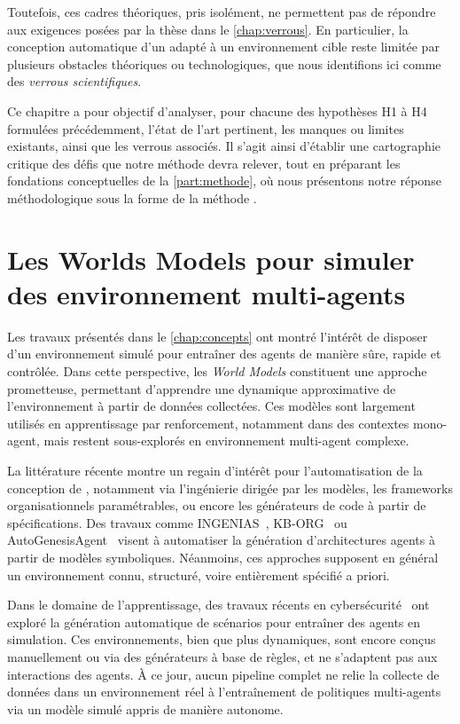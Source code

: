 Toutefois, ces cadres théoriques, pris isolément, ne permettent pas de répondre aux exigences posées par la thèse dans le \autoref{chap:verrous}. En particulier, la conception automatique d'un  adapté à un environnement cible reste limitée par plusieurs obstacles théoriques ou technologiques, que nous identifions ici comme des \textit{verrous scientifiques}.

Ce chapitre a pour objectif d'analyser, pour chacune des hypothèses H1 à H4 formulées précédemment, l'état de l'art pertinent, les manques ou limites existants, ainsi que les verrous associés. Il s'agit ainsi d'établir une cartographie critique des défis que notre méthode devra relever, tout en préparant les fondations conceptuelles de la \autoref{part:methode}, où nous présentons notre réponse méthodologique sous la forme de la méthode .


\section{Les Worlds Models pour simuler des environnement multi-agents}

\noindent
Les travaux présentés dans le \autoref{chap:concepts} ont montré l'intérêt de disposer d'un environnement simulé pour entraîner des agents de manière sûre, rapide et contrôlée. Dans cette perspective, les \textit{World Models} constituent une approche prometteuse, permettant d'apprendre une dynamique approximative de l'environnement à partir de données collectées. Ces modèles sont largement utilisés en apprentissage par renforcement, notamment dans des contextes mono-agent, mais restent sous-explorés en environnement multi-agent complexe.

\medskip

\noindent
La littérature récente montre un regain d'intérêt pour l'automatisation de la conception de , notamment via l'ingénierie dirigée par les modèles, les frameworks organisationnels paramétrables, ou encore les générateurs de code à partir de spécifications. Des travaux comme INGENIAS~\cite{Pavon2003}, KB-ORG~\cite{Sims2008} ou AutoGenesisAgent~\cite{harper2024autogenesisagent} visent à automatiser la génération d'architectures agents à partir de modèles symboliques. Néanmoins, ces approches supposent en général un environnement connu, structuré, voire entièrement spécifié a priori.

\noindent
Dans le domaine de l'apprentissage, des travaux récents en cybersécurité~\cite{hammar2023scalable} ont exploré la génération automatique de scénarios pour entraîner des agents en simulation. Ces environnements, bien que plus dynamiques, sont encore conçus manuellement ou via des générateurs à base de règles, et ne s'adaptent pas aux interactions des agents. À ce jour, aucun pipeline complet ne relie la collecte de données dans un environnement réel à l'entraînement de politiques multi-agents via un modèle simulé appris de manière autonome.

